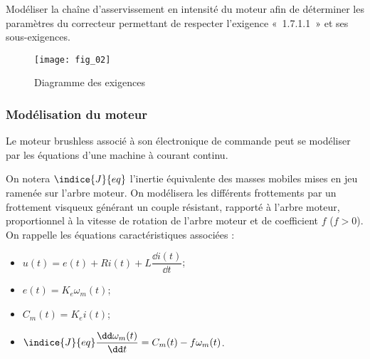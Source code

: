 \begin{obj}
Modéliser la chaîne d’asservissement en intensité du moteur afin de déterminer les paramètres du correcteur permettant de respecter l’exigence «~1.7.1.1~» et ses sous-exigences.
\end{obj}

\begin{figure}[H]
\centering
\texttt{[image: fig\_02]}
\caption{Diagramme des exigences \label{fig_02}}
\end{figure}
\fi


\subsubsection*{Modélisation du moteur}

\ifprof
\else

Le moteur brushless associé à son électronique de commande peut se modéliser par les équations d’une machine à courant continu. 


On notera $\indice{J}{eq}$ l’inertie équivalente des masses mobiles mises en jeu ramenée sur l’arbre moteur. On
modélisera les différents frottements par un frottement visqueux générant un couple résistant, rapporté
à l’arbre moteur, proportionnel à la vitesse de rotation de l’arbre moteur et de coefficient $f$ ($f > 0$).
On rappelle les équations caractéristiques associées :
\begin{itemize}
\item $u(t) = e(t)+Ri(t)+L\dfrac{\dd i(t)}{\dd t}$;
\item $e(t)=K_e\omega_m(t)$;
\item $C_m(t)=K_e i(t)$;
\item $\indice{J}{eq} \dfrac{\dd \omega_m(t)}{\dd t} = C_m(t)-f\omega_m(t)$.
\end{itemize}
\fi


